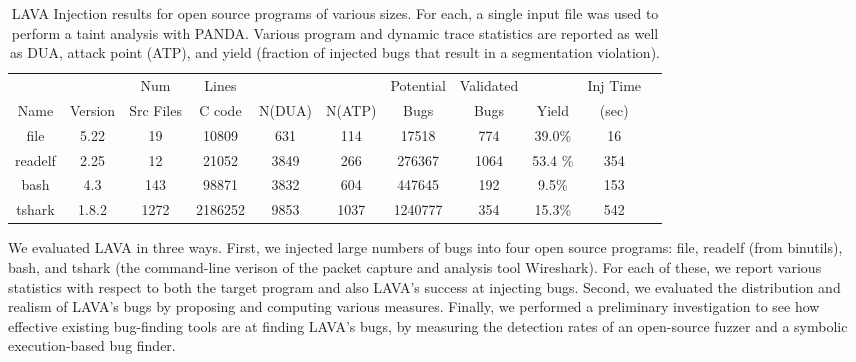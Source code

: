 \label{section:results}

\begin{table}[t!]
\centering
\begin{tabular}{c|c|c|c|c|c|c|c|c|c|c}
        &         & Num       & Lines     &        &        & Potential & Validated  &         & Inj Time \\
Name    & Version & Src Files & C code    & N(DUA) & N(ATP) & Bugs      & Bugs       & Yield   & (sec)  \\\hline
file    & 5.22    & 19        & 10809     & 631    & 114    & 17518     & 774        & 39.0\%  & 16         \\  %
readelf & 2.25    & 12        & 21052     & 3849   & 266    & 276367    & 1064       & 53.4 \% & 354     \\  %
bash    & 4.3     & 143       & 98871     & 3832   & 604    & 447645    & 192        & 9.5\%   & 153     \\  %
tshark  & 1.8.2   & 1272      & 2186252   & 9853   & 1037   & 1240777   & 354        & 15.3\%  & 542     \\
\end{tabular} 
\caption{LAVA Injection results for open source programs of various sizes.
For each, a single input file was used to perform a taint analysis with PANDA.
Various program and dynamic trace statistics are reported as well as DUA, attack point (ATP), and yield (fraction of injected bugs that result in a segmentation violation).}
\label{table:insertion-results}
\end{table}

We evaluated LAVA in three ways.
First, we injected large numbers of bugs into four open source programs: file, readelf (from binutils), bash, and tshark (the command-line verison of the packet capture and analysis tool Wireshark).
For each of these, we report various statistics with respect to both the target program and also LAVA's success at injecting bugs.
Second, we evaluated the distribution and realism of LAVA's bugs by proposing and computing various measures.
Finally, we performed a preliminary investigation to see how effective existing bug-finding tools are at finding LAVA's bugs, by measuring the detection rates of an open-source fuzzer and a symbolic execution-based bug finder.

